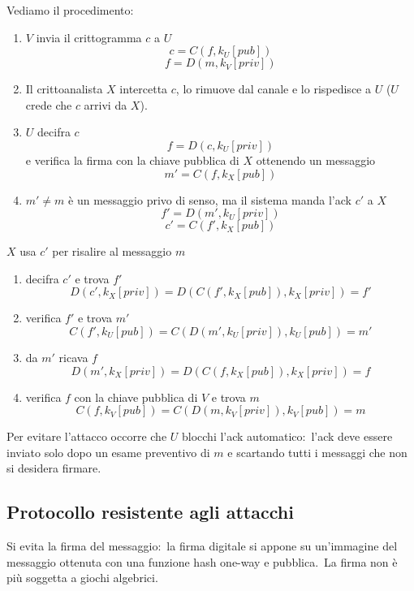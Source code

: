 \noindent Vediamo il procedimento:
\begin{enumerate}
    \item $V$ invia il crittogramma $c$ a $U$
          \[c = C(f, k_U[\mathit{pub}])\]
          \[f = D(m, k_V[\mathit{priv}])\]
    \item Il crittoanalista $X$ intercetta $c$, lo rimuove dal canale e lo rispedisce a $U$ ($U$ crede che $c$ arrivi da $X$).
    \item $U$ decifra $c$
          \[f = D(c, k_U[\mathit{priv}])\]
          e verifica la firma con la chiave pubblica di $X$ ottenendo un messaggio
          \[m' = C(f, k_X[\mathit{pub}])\]
    \item $m' \neq m$ è un messaggio privo di senso, ma il sistema manda l'ack $c'$ a $X$
          \[f' = D(m', k_U[\mathit{priv}])\]
          \[c' = C(f', k_X[\mathit{pub}])\]
\end{enumerate}

\noindent $X$ usa $c'$ per risalire al messaggio $m$
\begin{enumerate}
    \item decifra $c'$ e trova $f'$
          \[D(c', k_X[\mathit{priv}]) = D(C(f', k_X[\mathit{pub}]), k_X[\mathit{priv}]) = f'\]
    \item verifica $f'$ e trova $m'$
          \[C(f', k_U[\mathit{pub}]) = C(D(m', k_U[\mathit{priv}]), k_U[\mathit{pub}]) = m'\]
    \item da $m'$ ricava $f$
          \[D(m', k_X[\mathit{priv}]) = D(C(f, k_X[\mathit{pub}]), k_X[\mathit{priv}]) = f\]
    \item verifica $f$ con la chiave pubblica di $V$ e trova $m$
          \[C(f, k_V[\mathit{pub}]) = C(D(m, k_V[\mathit{priv}]), k_V[\mathit{pub}]) = m\]
\end{enumerate}

\noindent Per evitare l'attacco occorre che $U$ blocchi l'ack automatico:\ l'ack deve essere inviato solo dopo un esame preventivo di $m$ e scartando tutti i messaggi che non si desidera firmare.\

\subsection{Protocollo resistente agli attacchi}

Si evita la firma del messaggio:\ la firma digitale si appone su un'immagine del messaggio ottenuta con una funzione hash one-way e pubblica.\
La firma non è più soggetta a giochi algebrici.

